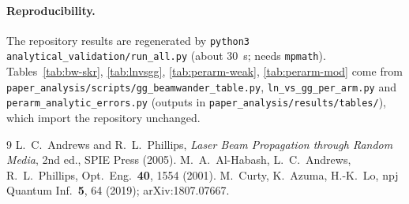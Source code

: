 \documentclass[11pt,a4paper]{article}
\theoremstyle{plain}
\theoremstyle{remark}
\begin{document}
\paragraph{Reproducibility.} The repository results are regenerated by \texttt{python3 analytical\_validation/run\_all.py} (about $30$~s; needs \texttt{mpmath}). Tables~\ref{tab:bw-skr}, \ref{tab:lnvsgg}, \ref{tab:perarm-weak}, \ref{tab:perarm-mod} come from \texttt{paper\_analysis/scripts/gg\_beamwander\_table.py}, \texttt{ln\_vs\_gg\_per\_arm.py} and \texttt{perarm\_analytic\_errors.py} (outputs in \texttt{paper\_analysis/results/tables/}), which import the repository unchanged.

\begin{thebibliography}{9}
 L.~C.~Andrews and R.~L.~Phillips, \emph{Laser Beam Propagation through Random Media}, 2nd ed., SPIE Press (2005).
 M.~A.~Al-Habash, L.~C.~Andrews, R.~L.~Phillips, Opt.\ Eng.\ \textbf{40}, 1554 (2001).
 M.~Curty, K.~Azuma, H.-K.~Lo, npj Quantum Inf.\ \textbf{5}, 64 (2019); arXiv:1807.07667.
\end{thebibliography}
\end{document}
